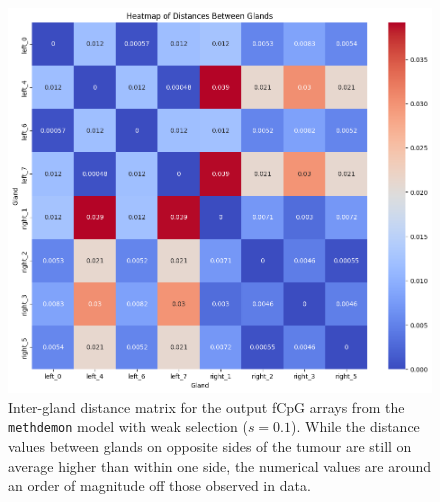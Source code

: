 \begin{figure}[h]
    \centering
    \includegraphics[width=\textwidth]{Chapter_5/figures/10000dist.png}
    \caption{Inter-gland distance matrix for the output fCpG arrays from the
    \texttt{methdemon} model with weak selection ($s=0.1$). While the distance
    values between glands on opposite sides of the tumour are still on average
    higher than within one side, the numerical values are around an order of
    magnitude off those observed in data.}
    \label{fig:methdemon_weak_dist}
\end{figure}

